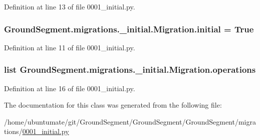 Definition at line 13 of file 0001\+\_\+initial.\+py.

\hypertarget{class_ground_segment_1_1migrations_1_10001__initial_1_1_migration_a460cd47c2c35761869442aae6f00d4af}{}
\subsubsection[{initial}]{\setlength{\rightskip}{0pt plus 5cm}Ground\+Segment.\+migrations.\+\_\+initial.\+Migration.\+initial = True\hspace{0.3cm}{\ttfamily [static]}}\label{class_ground_segment_1_1migrations_1_10001__initial_1_1_migration_a460cd47c2c35761869442aae6f00d4af}


Definition at line 11 of file 0001\+\_\+initial.\+py.

\hypertarget{class_ground_segment_1_1migrations_1_10001__initial_1_1_migration_a44994e17a192fe01d74b92136e977e36}{}
\subsubsection[{operations}]{\setlength{\rightskip}{0pt plus 5cm}list Ground\+Segment.\+migrations.\+\_\+initial.\+Migration.\+operations\hspace{0.3cm}{\ttfamily [static]}}\label{class_ground_segment_1_1migrations_1_10001__initial_1_1_migration_a44994e17a192fe01d74b92136e977e36}


Definition at line 16 of file 0001\+\_\+initial.\+py.



The documentation for this class was generated from the following file\+:\begin{DoxyCompactItemize}
\item 
/home/ubuntumate/git/\+Ground\+Segment/\+Ground\+Segment/\+Ground\+Segment/migrations/\hyperlink{0001__initial_8py}{0001\+\_\+initial.\+py}\end{DoxyCompactItemize}

